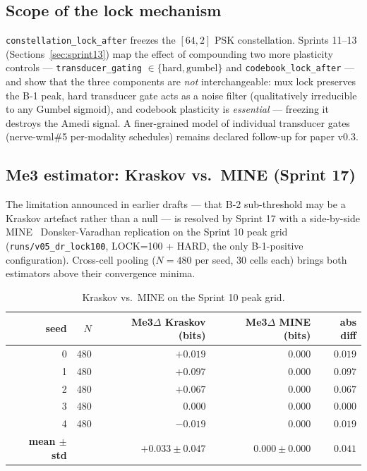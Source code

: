\documentclass{article}
\begin{document}
\subsection{Scope of the lock mechanism}

\texttt{constellation\_lock\_after} freezes the $[64, 2]$ PSK
constellation. Sprints 11--13
(Sections~\ref{sec:sprint13}) map the effect of compounding two
more plasticity controls --- \texttt{transducer\_gating} $\in
\{\mathrm{hard}, \mathrm{gumbel}\}$ and
\texttt{codebook\_lock\_after} --- and show that the three
components are \emph{not} interchangeable: mux lock preserves the
B-1 peak, hard transducer gate acts as a noise filter
(qualitatively irreducible to any Gumbel sigmoid), and codebook
plasticity is \emph{essential} --- freezing it destroys the Amedi
signal. A finer-grained model of individual transducer gates
(nerve-wml\#5 per-modality schedules) remains declared follow-up
for paper v0.3.

\subsection{Me3 estimator: Kraskov vs.\ MINE (Sprint 17)}
\label{sec:limitations-estimator}

The limitation announced in earlier drafts --- that B-2
sub-threshold may be a Kraskov artefact rather than a null --- is
resolved by Sprint 17 with a side-by-side
MINE~\citep{belghazi2018mine} Donsker-Varadhan replication on the
Sprint 10 peak grid (\texttt{runs/v05\_dr\_lock100}, LOCK=100 +
HARD, the only B-1-positive configuration). Cross-cell pooling
($N = 480$ per seed, 30 cells each) brings both estimators above
their convergence minima.

\begin{table}[ht]
  \centering
  \caption{Kraskov vs.\ MINE on the Sprint 10 peak grid.}
  \label{tab:kraskov-mine}
  \begin{tabular}{rrrrr}
    \toprule
    seed & $N$ & Me3$\Delta$ Kraskov (bits) & Me3$\Delta$ MINE (bits) & abs diff \\
    \midrule
    0 & 480 & $+0.019$ & $0.000$ & $0.019$ \\
    1 & 480 & $\mathbf{+0.097}$ & $0.000$ & $0.097$ \\
    2 & 480 & $+0.067$ & $0.000$ & $0.067$ \\
    3 & 480 & $0.000$  & $0.000$ & $0.000$ \\
    4 & 480 & $-0.019$ & $0.000$ & $0.019$ \\
    \midrule
    \textbf{mean $\pm$ std} & & $\mathbf{+0.033 \pm 0.047}$ & $\mathbf{0.000 \pm 0.000}$ & $0.041$ \\
    \bottomrule
  \end{tabular}
\end{table}
\end{document}

